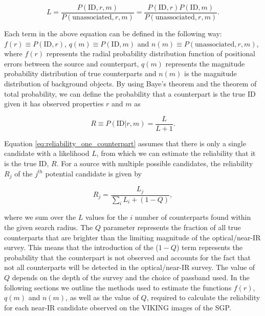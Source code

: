 \begin{equation}
\label{eq:likelihood_ratio}
    L = \frac{P(\textrm{ID}, r, m)}{P(\textrm{unassociated}, r, m)} = \frac{P(\textrm{ID}, r) P(\textrm{ID}, m)}{P(\textrm{unassociated}, r, m)}.
\end{equation}

Each term in the above equation can be defined in the following way: $f(r) \equiv P(\textrm{ID}, r)$, $q(m) \equiv P(\textrm{ID}, m)$ and $n(m) \equiv P(\textrm{unassociated}, r, m)$, where $f(r)$ represents the radial probability distribution function of positional errors between the source and counterpart, $q(m)$ represents the magnitude probability distribution of true counterparts and $n(m)$ is the magnitude distribution of background objects. By using Baye's theorem and the theorem of total probability, we can define the probability that a counterpart is the true ID given it has observed properties $r$ and $m$ as

\begin{equation}
\label{eq:reliability_one_counterpart}
    R \equiv P(\textrm{ID}| r, m) = \frac{L}{L+1}.
\end{equation}

Equation \ref{eq:reliability_one_counterpart} assumes that there is only a single candidate with a likelihood $L$, from which we can estimate the reliability that it is the true ID, $R$. For a source with multiple possible candidates, the reliability $R_j$ of the $j^{th}$ potential candidate is given by

\begin{equation}
    \label{eq:reliability_multiple_counterparts}
        R_j = \frac{L_j}{\sum_i L_i + (1-Q)},
\end{equation}

\noindent where we sum over the $L$ values for the $i$ number of counterparts found within the given search radius. The $Q$ parameter represents the fraction of all true counterparts that are brighter than the limiting magnitude of the optical/near-IR survey. This means that the introduction of the ($1 - Q$) term represents the probability that the counterpart is not observed and accounts for the fact that not all counterparts will be detected in the optical/near-IR survey. The value of $Q$ depends on the depth of the survey and the choice of passband used. In the following sections we outline the methods used to estimate the functions $f(r)$, $q(m)$ and $n(m)$, as well as the value of $Q$, required to calculate the reliability for each near-IR candidate observed on the VIKING images of the SGP.

